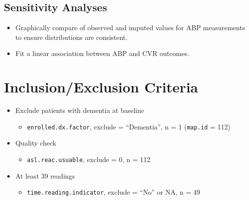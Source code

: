 \documentclass[10pt]{article}\usepackage[]{graphicx}\usepackage[]{color}
\newcommand{\code}[1]{\texttt{\smaller #1}}
\begin{document}
\subsection{Sensitivity Analyses}

\begin{itemize}
  \item Graphically compare of observed and imputed values for ABP measurements to ensure distributions are consistent.
  \item Fit a linear association between ABP and CVR outcomes.
\end{itemize}

\clearpage

\section{Inclusion/Exclusion Criteria}

\begin{itemize}
  \item Exclude patients with dementia at baseline
  \begin{itemize}
      \item \code{enrolled.dx.factor}, exclude = ``Dementia'', n = 1 (\code{map.id} = 112)
  \end{itemize} 
  \item Quality check
  \begin{itemize}
    \item \code{asl.reac.usuable}, exclude = 0, n = 112
  \end{itemize}
  \item At least 39 readings
  \begin{itemize}
    \item \code{time.reading.indicator}, exclude = ``No'' or NA, n = 49
  \end{itemize}  
\end{itemize}
\end{document}
